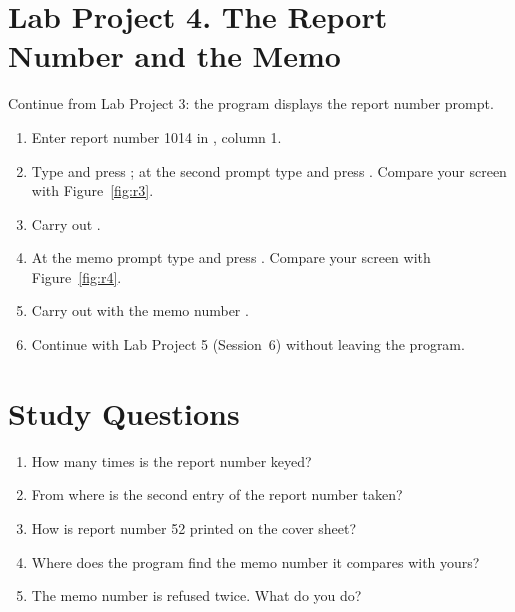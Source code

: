 \section{Lab Project 4. The Report Number and the Memo}
Continue from Lab Project 3: the program displays the report number prompt.
\begin{enumerate}
\item Enter report number 1014 in , column 1.
\item Type  and press ; at the second prompt type
   and press .  Compare your screen with
  Figure~\ref{fig:r3}.
\item Carry out .
\item At the memo prompt type  and press .  Compare
  your screen with Figure~\ref{fig:r4}.
\item Carry out  with the memo number .
\item Continue with Lab Project 5 (Session~6) without leaving the program.
\end{enumerate}

\section{Study Questions}
\begin{enumerate}
\item How many times is the report number keyed?
\item From where is the second entry of the report number taken?
\item How is report number 52 printed on the cover sheet?
\item Where does the program find the memo number it compares with yours?
\item The memo number is refused twice.  What do you do?
\end{enumerate}
